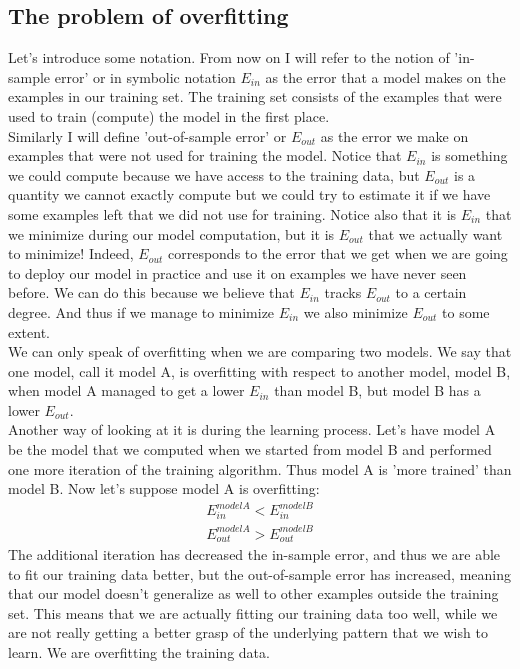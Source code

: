 \subsection{The problem of overfitting}
Let's introduce some notation. From now on I will refer to the notion of 'in-sample error' or in symbolic notation $E_{in}$ as the error that a model makes on the examples in our training set. The training set consists of the examples that were used to train (compute) the model in the first place. \\
Similarly I will define 'out-of-sample error' or $E_{out}$ as the error we make on examples that were not used for training the model. Notice that $E_{in}$ is something we could compute because we have access to the training data, but $E_{out}$ is a quantity we cannot exactly compute but we could try to estimate it if we have some examples left that we did not use for training. Notice also that it is $E_{in}$ that we minimize during our model computation, but it is $E_{out}$ that we actually want to minimize! Indeed, $E_{out}$ corresponds to the error that we get when we are going to deploy our model in practice and use it on examples we have never seen before. We can do this because we believe that $E_{in}$ tracks $E_{out}$ to a certain degree. And thus if we manage to minimize $E_{in}$ we also minimize $E_{out}$ to some extent. \\
We can only speak of overfitting when we are comparing two models. We say that one model, call it model A, is overfitting with respect to another model, model B, when model A managed to get a lower $E_{in}$ than model B, but model B has a lower $E_{out}$. \\
Another way of looking at it is during the learning process. Let's have model A be the model that we computed when we started from model B and performed one more iteration of the training algorithm. Thus model A is 'more trained' than model B. Now let's suppose model A is overfitting:
\begin{align}
E_{in}^{modelA} < E_{in}^{modelB} \\
E_{out}^{modelA} > E_{out}^{modelB}
\end{align}
The additional iteration has decreased the in-sample error, and thus we are able to fit our training data better, but the out-of-sample error has increased, meaning that our model doesn't generalize as well to other examples outside the training set. This means that we are actually fitting our training data too well, while we are not really getting a better grasp of the underlying pattern that we wish to learn. We are overfitting the training data.\\
